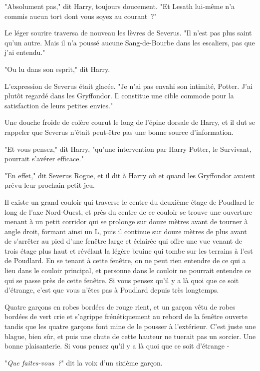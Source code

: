 "Absolument pas," dit Harry, toujours doucement. "Et Lesath lui-même n'a commis aucun tort dont vous soyez au courant~?"

Le léger sourire traversa de nouveau les lèvres de Severus. "Il n'est pas plus saint qu'un autre. Mais il n'a poussé aucune Sang-de-Bourbe dans les escaliers, pas que j'ai entendu."

"Ou lu dans son esprit," dit Harry.

L'expression de Severus était glacée. "Je n'ai pas envahi son intimité, Potter. J'ai plutôt regardé dans les Gryffondor. Il constitue une cible commode pour la satisfaction de leurs petites envies."

Une douche froide de colère courut le long de l'épine dorsale de Harry, et il dut se rappeler que Severus n'était peut-être pas une bonne source d'information.

"Et vous pensez," dit Harry, "qu'une intervention par Harry Potter, le Survivant, pourrait s'avérer efficace."

"En effet," dit Severus Rogue, et il dit à Harry où et quand les Gryffondor avaient prévu leur prochain petit jeu.

\later

Il existe un grand couloir qui traverse le centre du deuxième étage de Poudlard le long de l'axe Nord-Ouest, et près du centre de ce couloir se trouve une ouverture menant à un petit corridor qui se prolonge sur douze mètres avant de tourner à angle droit, formant ainsi un L, puis il continue sur douze mètres de plus avant de s'arrêter au pied d'une fenêtre large et éclairée qui offre une vue venant de trois étage plus haut et révélant la légère bruine qui tombe sur les terrains à l'est de Poudlard. En se tenant à cette fenêtre, on ne peut rien entendre de ce qui a lieu dans le couloir principal, et personne dans le couloir ne pourrait entendre ce qui se passe près de cette fenêtre. Si vous pensez qu'il y a là quoi que ce soit d'étrange, c'est que vous n'êtes pas à Poudlard depuis très longtemps.

Quatre garçons en robes bordées de rouge rient, et un garçon vêtu de robes bordées de vert crie et s'agrippe frénétiquement au rebord de la fenêtre ouverte tandis que les quatre garçons font mine de le pousser à l'extérieur. C'est juste une blague, bien sûr, et puis une chute de cette hauteur ne tuerait pas un sorcier. Une bonne plaisanterie. Si vous pensez qu'il y a là quoi que ce soit d'étrange -

"\emph{Que faites-vous~?}" dit la voix d'un sixième garçon.

